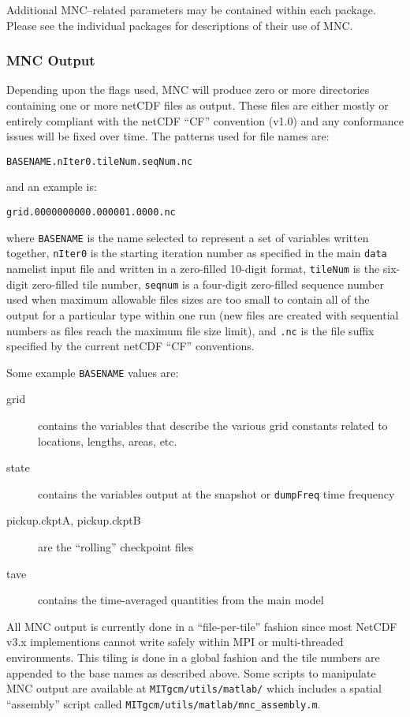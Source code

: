 Additional MNC--related parameters may be contained within each
package.  Please see the individual packages for descriptions of their
use of MNC.


\subsubsection{MNC Output}

Depending upon the flags used, MNC will produce zero or more
directories containing one or more netCDF files as output.  These
files are either mostly or entirely compliant with the netCDF ``CF''
convention (v1.0) and any conformance issues will be fixed over time.
The patterns used for file names are:
\begin{center}
\texttt{BASENAME.nIter0.tileNum.seqNum.nc}
\end{center}
and an example is:
\begin{center}
\texttt{grid.0000000000.000001.0000.nc}
\end{center}
where \texttt{BASENAME} is the name selected to represent a set of
variables written together, \texttt{nIter0} is the starting iteration
number as specified in the main \texttt{data} namelist input file and
written in a zero-filled 10-digit format, \texttt{tileNum} is the
six-digit zero-filled tile number, \texttt{seqnum} is a four-digit
zero-filled sequence number used when maximum allowable files sizes
are too small to contain all of the output for a particular type
within one run (new files are created with sequential numbers as files
reach the maximum file size limit), and \texttt{.nc} is the file
suffix specified by the current netCDF ``CF'' conventions.

Some example \texttt{BASENAME} values are:
\begin{description}
\item[grid] contains the variables that describe the various grid
  constants related to locations, lengths, areas, etc.
\item[state] contains the variables output at the snapshot or
  \texttt{dumpFreq} time frequency
\item[pickup.ckptA, pickup.ckptB] are the ``rolling'' checkpoint files
\item[tave] contains the time-averaged quantities from the main model
\end{description}

All MNC output is currently done in a ``file-per-tile'' fashion since
most NetCDF v3.x implementions cannot write safely within MPI or
multi-threaded environments.  This tiling is done in a global fashion
and the tile numbers are appended to the base names as described
above.  Some scripts to manipulate MNC output are available at
\texttt{MITgcm/utils/matlab/} which includes a spatial ``assembly''
script called \texttt{MITgcm/utils/matlab/mnc\_assembly.m}.

